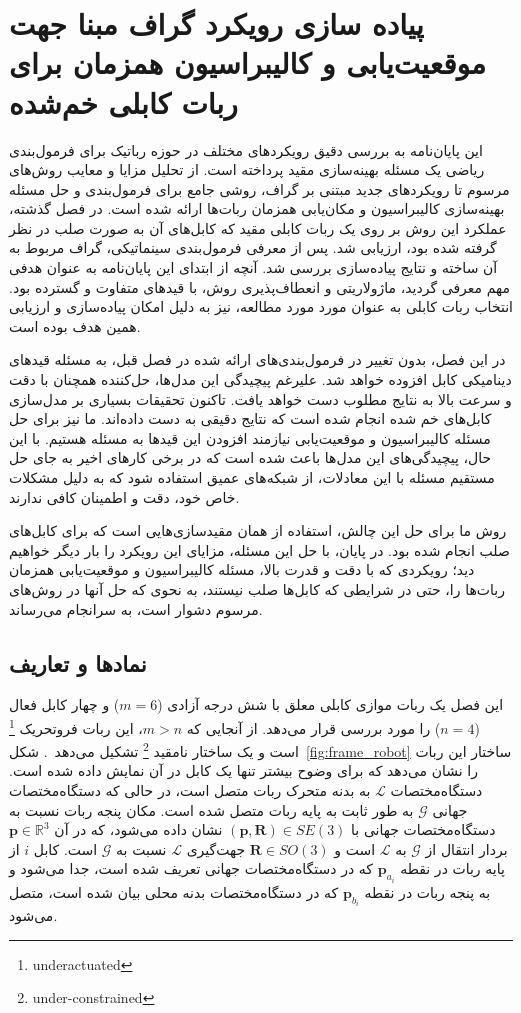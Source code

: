 \chapter{پیاده سازی رویکرد گراف مبنا جهت موقعیت‌یابی و کالیبراسیون همزمان برای ربات کابلی خم‌شده}
این پایان‌نامه به بررسی دقیق رویکردهای مختلف در حوزه رباتیک برای فرمول‌بندی ریاضی یک مسئله بهینه‌سازی مقید پرداخته است. از تحلیل مزایا و معایب روش‌های مرسوم تا رویکردهای جدید مبتنی بر گراف، روشی جامع برای فرمول‌بندی و حل مسئله بهینه‌سازی کالیبراسیون و مکان‌یابی همزمان ربات‌ها ارائه شده است. در فصل گذشته، عملکرد این روش بر روی یک ربات کابلی مقید که کابل‌های آن به صورت صلب در نظر گرفته شده بود، ارزیابی شد. پس از معرفی فرمول‌بندی سینماتیکی، گراف مربوط به آن ساخته و نتایج پیاده‌سازی بررسی شد. آنچه از ابتدای این پایان‌نامه به عنوان هدفی مهم معرفی گردید، ماژولاریتی و انعطاف‌پذیری روش، با قیدهای متفاوت و گسترده بود. انتخاب ربات کابلی به عنوان مورد مورد مطالعه، نیز به دلیل امکان پیاده‌سازی و ارزیابی همین هدف بوده است.

در این فصل، بدون تغییر در فرمول‌بندی‌های ارائه شده در فصل قبل، به مسئله قیدهای دینامیکی کابل افزوده خواهد شد. علیرغم پیچیدگی این مدل‌ها، حل‌کننده همچنان با دقت و سرعت بالا به نتایج مطلوب دست خواهد یافت. تاکنون تحقیقات بسیاری بر مدل‌سازی کابل‌های خم شده انجام شده است که نتایج دقیقی به دست داده‌اند. ما نیز برای حل مسئله کالیبراسیون و موقعیت‌یابی نیازمند افزودن این قیدها به مسئله هستیم. با این حال، پیچیدگی‌های این مدل‌ها باعث شده است که در برخی کارهای اخیر به جای حل مستقیم مسئله با این معادلات، از شبکه‌های عمیق استفاده شود که به دلیل مشکلات خاص خود، دقت و اطمینان کافی ندارند.

روش ما برای حل این چالش، استفاده از همان مقیدسازی‌هایی است که برای کابل‌های صلب انجام شده بود. در پایان، با حل این مسئله، مزایای این رویکرد را بار دیگر خواهیم دید؛ رویکردی که با دقت و قدرت بالا، مسئله کالیبراسیون و موقعیت‌یابی همزمان ربات‌ها را، حتی در شرایطی که کابل‌ها صلب نیستند، به نحوی که حل آنها در روش‌های مرسوم دشوار است، به سرانجام می‌رساند.



\section{نمادها و تعاریف} \label{subsec:Assm}
این فصل یک ربات موازی کابلی معلق با شش درجه آزادی ($m=6$) و چهار کابل فعال ($n=4$) را مورد بررسی قرار می‌دهد. از آنجایی که $m>n$، این ربات فروتحریک
\footnote{underactuated}
 است و یک ساختار نامقید
\footnote{under-constrained}
تشکیل می‌دهد~\cite{ida2021natural}. 
شکل~\ref{fig:frame_robot} ساختار این ربات را نشان می‌دهد که برای وضوح بیشتر تنها یک کابل در آن نمایش داده شده است. 
دستگاه‌مختصات $\mathcal{L}$ به بدنه متحرک ربات متصل است، در حالی که دستگاه‌مختصات جهانی $\mathcal{G}$ به طور ثابت به پایه ربات متصل شده است. مکان پنجه ربات نسبت به دستگاه‌مختصات جهانی با
 $(\bm{p},\bm{R}) \in SE(3)$
نشان داده می‌شود، که در آن
 $\bm{p} \in \mathbb{R}^3$
بردار انتقال از $\mathcal{G}$ به $\mathcal{L}$ است و
 $\bm{R} \in SO(3)$
جهت‌گیری $\mathcal{L}$ نسبت به $\mathcal{G}$ است. کابل $i$ از پایه ربات در نقطه $\bm{p}_{a_i}$ که در دستگاه‌مختصات جهانی تعریف شده است، جدا می‌شود و به پنجه ربات در نقطه $\bm{p}_{b_i}$ که در دستگاه‌مختصات بدنه محلی بیان شده است، متصل می‌شود.

